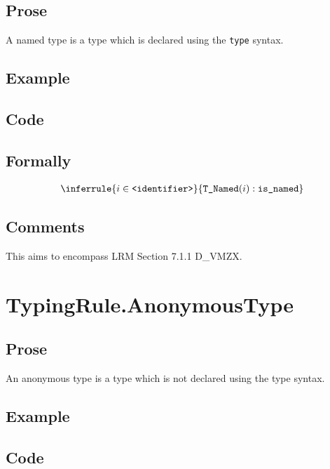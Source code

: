 \documentclass{book}
\begin{document}
    \subsection{Prose}
    A named type is a type which is declared using the \texttt{type} syntax.

    \subsection{Example}

    \subsection{Code}

\begin{formal}
      \subsection{Formally}
\newcommand\isnamed[0]{\texttt{is\_named}}
\[
\begin{array}{c}
\inferrule{i \in \identifier}{\TNamed(i) : \isnamed}
\end{array}
\]
\end{formal}

    \subsection{Comments}
    This aims to encompass LRM Section 7.1.1 D\_VMZX.

\section{TypingRule.AnonymousType \label{sec:TypingRule.AnonymousType}}

    \subsection{Prose} 
    An anonymous type is a type which is not declared using the type syntax. 

    \subsection{Example}

    \subsection{Code}
\end{document}

